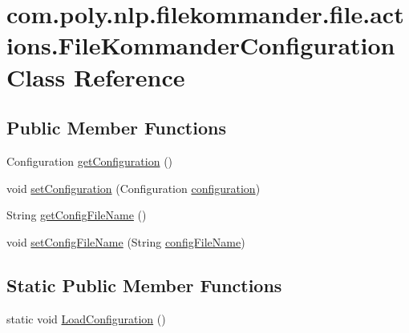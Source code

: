 \hypertarget{classcom_1_1poly_1_1nlp_1_1filekommander_1_1file_1_1actions_1_1_file_kommander_configuration}{\section{com.\-poly.\-nlp.\-filekommander.\-file.\-actions.\-File\-Kommander\-Configuration Class Reference}
\label{classcom_1_1poly_1_1nlp_1_1filekommander_1_1file_1_1actions_1_1_file_kommander_configuration}
}
\subsection*{Public Member Functions}
\begin{DoxyCompactItemize}
\item 
Configuration \hyperlink{classcom_1_1poly_1_1nlp_1_1filekommander_1_1file_1_1actions_1_1_file_kommander_configuration_ac100dbeed1c4a29d9be4b943d21dbb19}{get\-Configuration} ()
\item 
void \hyperlink{classcom_1_1poly_1_1nlp_1_1filekommander_1_1file_1_1actions_1_1_file_kommander_configuration_a251c46b2eace39154ac126a18c8ee5af}{set\-Configuration} (Configuration \hyperlink{classcom_1_1poly_1_1nlp_1_1filekommander_1_1file_1_1actions_1_1_file_kommander_configuration_af384cf1346411acf76036936b6ad43d3}{configuration})
\item 
String \hyperlink{classcom_1_1poly_1_1nlp_1_1filekommander_1_1file_1_1actions_1_1_file_kommander_configuration_a99fb390b7ca5f81d09daf5ad25d42614}{get\-Config\-File\-Name} ()
\item 
void \hyperlink{classcom_1_1poly_1_1nlp_1_1filekommander_1_1file_1_1actions_1_1_file_kommander_configuration_a3911964f0612f2f33b6845e4094584c7}{set\-Config\-File\-Name} (String \hyperlink{classcom_1_1poly_1_1nlp_1_1filekommander_1_1file_1_1actions_1_1_file_kommander_configuration_ac737e4b5403a98e4922435bd38bedb2d}{config\-File\-Name})
\end{DoxyCompactItemize}
\subsection*{Static Public Member Functions}
\begin{DoxyCompactItemize}
\item 
static void \hyperlink{classcom_1_1poly_1_1nlp_1_1filekommander_1_1file_1_1actions_1_1_file_kommander_configuration_a1dbcc29a7f4788777b021ba88109d2d2}{Load\-Configuration} ()
\end{DoxyCompactItemize}
